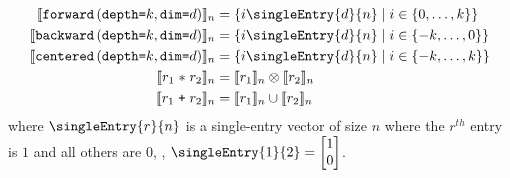 \begin{align*}
%
%
\interp{\stenFwd{k}{d}}_n & =
 \{i\singleEntry{d}{n} \mid i \in \{0, \ldots, k\} \} \\
\interp{\stenBwd{k}{d}}_n & =
 \{i\singleEntry{d}{n} \mid i \in \{-k, \ldots, 0\} \} \\
\interp{\stenCen{k}{d}}_n & =
 \{i\singleEntry{d}{n} \mid i \in \{-k, \ldots, k\} \} \\
%
%
\interp{r_1 \; \texttt{$\ast$} \; r_2}_n &
= \interp{r_1}_n \otimes \interp{r_2}_n \\
%
%
\interp{r_1 \; \texttt{+} \; r_2}_n &
= \interp{r_1}_n \cup \interp{r_2}_n
\end{align*}
where $\singleEntry{r}{n}$ is a single-entry vector of size $n$
where the $r^{th}$ entry is $1$ and all others are $0$, \eg{},
$\singleEntry{1}{2} = \vtwo{1}{0}$.